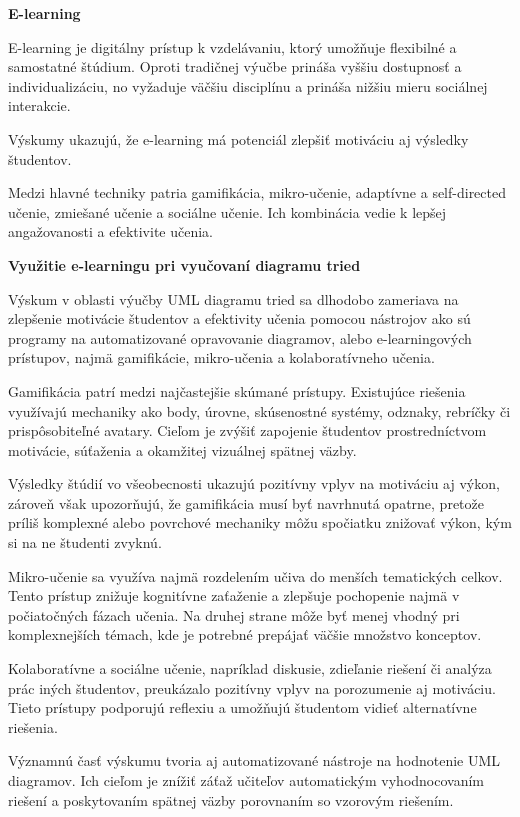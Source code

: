 \textbf{E-learning}

E-learning je digitálny prístup k vzdelávaniu, ktorý umožňuje flexibilné a samostatné štúdium. Oproti tradičnej výučbe prináša vyššiu dostupnosť a individualizáciu, no vyžaduje väčšiu disciplínu a prináša nižšiu mieru sociálnej interakcie.

Výskumy ukazujú, že e-learning má potenciál zlepšiť motiváciu aj výsledky študentov.%

Medzi hlavné techniky patria gamifikácia, mikro-učenie, adaptívne a self-directed učenie, zmiešané učenie a sociálne učenie. Ich kombinácia vedie k lepšej angažovanosti a efektivite učenia.

\textbf{Využitie e-learningu pri vyučovaní diagramu tried}

Výskum v oblasti výučby UML diagramu tried sa dlhodobo zameriava na zlepšenie motivácie študentov a efektivity učenia pomocou nástrojov ako sú programy na automatizované opravovanie diagramov, alebo e-learningových prístupov, najmä gamifikácie, mikro-učenia a kolaboratívneho učenia.

Gamifikácia patrí medzi najčastejšie skúmané prístupy. Existujúce riešenia využívajú mechaniky ako body, úrovne, skúsenostné systémy, odznaky, rebríčky či prispôsobiteľné avatary. Cieľom je zvýšiť zapojenie študentov prostredníctvom motivácie, súťaženia a okamžitej vizuálnej spätnej väzby. 

Výsledky štúdií vo všeobecnosti ukazujú pozitívny vplyv na motiváciu aj výkon, zároveň však upozorňujú, že gamifikácia musí byť navrhnutá opatrne, pretože príliš komplexné alebo povrchové mechaniky môžu spočiatku znižovať výkon, kým si na ne študenti zvyknú.

Mikro-učenie sa využíva najmä rozdelením učiva do menších tematických celkov. Tento prístup znižuje kognitívne zaťaženie a zlepšuje pochopenie najmä v počiatočných fázach učenia. Na druhej strane môže byť menej vhodný pri komplexnejších témach, kde je potrebné prepájať väčšie množstvo konceptov.

Kolaboratívne a sociálne učenie, napríklad diskusie, zdieľanie riešení či analýza prác iných študentov, preukázalo pozitívny vplyv na porozumenie aj motiváciu. Tieto prístupy podporujú reflexiu a umožňujú študentom vidieť alternatívne riešenia.

Významnú časť výskumu tvoria aj automatizované nástroje na hodnotenie UML diagramov. Ich cieľom je znížiť záťaž učiteľov automatickým vyhodnocovaním riešení a poskytovaním spätnej väzby porovnaním so vzorovým riešením. 

